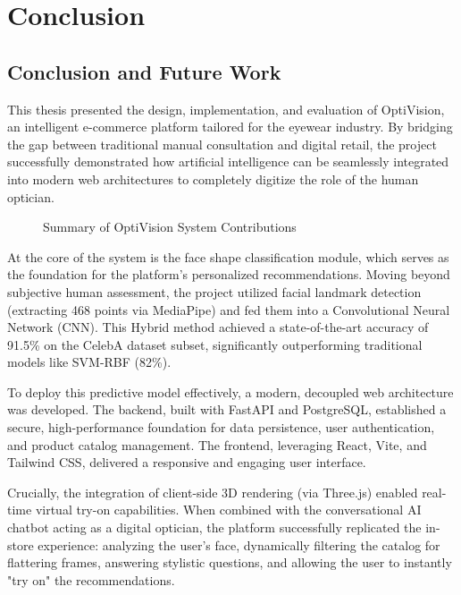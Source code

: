 \part{Conclusion}
\label{chap:conclusion_part}

\chapter*{Conclusion and Future Work}

This thesis presented the design, implementation, and evaluation of OptiVision, an intelligent e-commerce platform tailored for the eyewear industry. By bridging the gap between traditional manual consultation and digital retail, the project successfully demonstrated how artificial intelligence can be seamlessly integrated into modern web architectures to completely digitize the role of the human optician.

\begin{figure}[H]
    \centering
    \vspace{8cm}
    \caption{Summary of OptiVision System Contributions}
    \label{fig:conclusion_summary}
\end{figure}

At the core of the system is the face shape classification module, which serves as the foundation for the platform's personalized recommendations. Moving beyond subjective human assessment, the project utilized facial landmark detection (extracting 468 points via MediaPipe) and fed them into a Convolutional Neural Network (CNN). This Hybrid method achieved a state-of-the-art accuracy of 91.5\% on the CelebA dataset subset, significantly outperforming traditional models like SVM-RBF (82\%).

To deploy this predictive model effectively, a modern, decoupled web architecture was developed. The backend, built with FastAPI and PostgreSQL, established a secure, high-performance foundation for data persistence, user authentication, and product catalog management. The frontend, leveraging React, Vite, and Tailwind CSS, delivered a responsive and engaging user interface. 

Crucially, the integration of client-side 3D rendering (via Three.js) enabled real-time virtual try-on capabilities. When combined with the conversational AI chatbot acting as a digital optician, the platform successfully replicated the in-store experience: analyzing the user's face, dynamically filtering the catalog for flattering frames, answering stylistic questions, and allowing the user to instantly "try on" the recommendations.

